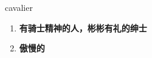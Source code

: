 
\begin{frame}
{\huge cavalier}
\begin{center}
\begin{enumerate}\Large
  \item \textbf{有骑士精神的人，彬彬有礼的绅士}
  \item \textbf{傲慢的}
\end{enumerate}
\end{center}
\end{frame}
